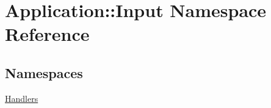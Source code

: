 \hypertarget{namespaceApplication_1_1Input}{}\section{Application\+:\+:Input Namespace Reference}
\label{namespaceApplication_1_1Input}
\subsection*{Namespaces}
\begin{DoxyCompactItemize}
\item 
 \mbox{\hyperlink{namespaceApplication_1_1Input_1_1Handlers}{Handlers}}
\end{DoxyCompactItemize}
